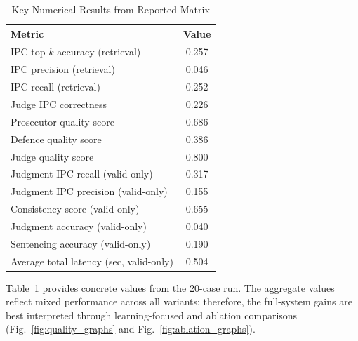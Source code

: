 \documentclass[conference]{IEEEtran}
\begin{document}
\begin{table}[!t]
\caption{Key Numerical Results from Reported Matrix}
\label{tab:key_metrics}
\centering
\begin{tabular}{|l|c|}
\hline
\textbf{Metric} & \textbf{Value} \\
\hline
IPC top-$k$ accuracy (retrieval) & 0.257 \\
IPC precision (retrieval) & 0.046 \\
IPC recall (retrieval) & 0.252 \\
Judge IPC correctness & 0.226 \\
Prosecutor quality score & 0.686 \\
Defence quality score & 0.386 \\
Judge quality score & 0.800 \\
Judgment IPC recall (valid-only) & 0.317 \\
Judgment IPC precision (valid-only) & 0.155 \\
Consistency score (valid-only) & 0.655 \\
Judgment accuracy (valid-only) & 0.040 \\
Sentencing accuracy (valid-only) & 0.190 \\
Average total latency (sec, valid-only) & 0.504 \\
\hline
\end{tabular}
\end{table}

Table~\ref{tab:key_metrics} provides concrete values from the 20-case run. The aggregate values reflect mixed performance across all variants; therefore, the full-system gains are best interpreted through learning-focused and ablation comparisons (Fig.~\ref{fig:quality_graphs} and Fig.~\ref{fig:ablation_graphs}).
\end{document}
